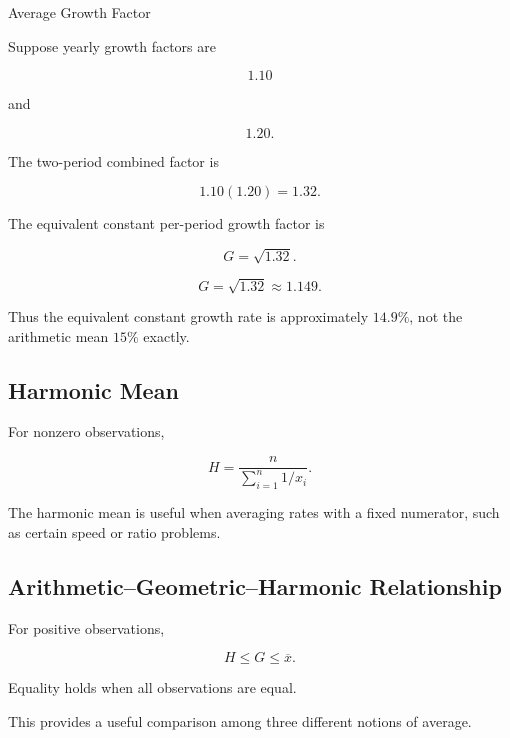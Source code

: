 \begin{workedexamplebox}{Average Growth Factor}

Suppose yearly growth factors are

\[
1.10
\]

and

\[
1.20.
\]

The two-period combined factor is

\[
1.10(1.20)=1.32.
\]

The equivalent constant per-period growth factor is

\[
G
=
\sqrt{1.32}.
\]

\begin{answerbox}
\[
\boxed{
G
=
\sqrt{1.32}
\approx
1.149.
}
\]
\end{answerbox}

Thus the equivalent constant growth rate is approximately \(14.9\%\),
not the arithmetic mean \(15\%\) exactly.

\end{workedexamplebox}

\subsection{Harmonic Mean}
\label{subsec:harmonic-mean}

For nonzero observations,

\[
\boxed{
H
=
\frac{
n
}{
\sum_{i=1}^{n}
1/x_i
}.
}
\]

The harmonic mean is useful when averaging rates with a fixed numerator,
such as certain speed or ratio problems.

\subsection{Arithmetic--Geometric--Harmonic Relationship}
\label{subsec:agh-means}

For positive observations,

\[
\boxed{
H
\leq
G
\leq
\overline{x}.
}
\]

Equality holds when all observations are equal.

This provides a useful comparison among three different notions of
average.

